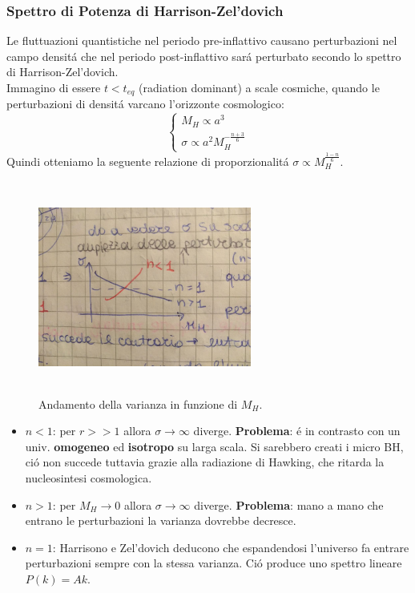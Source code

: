 \documentclass[12pt, a4paper]{article}
\begin{document}
\subsubsection{Spettro di Potenza di Harrison-Zel'dovich}
Le fluttuazioni quantistiche nel periodo pre-inflattivo causano perturbazioni nel campo densit\'{a} che nel periodo post-inflattivo sar\'{a} perturbato secondo lo spettro di Harrison-Zel'dovich.\\
Immagino di essere $t<t_{eq}$ (radiation dominant) a scale cosmiche, quando le perturbazioni di densit\'{a} varcano l'orizzonte cosmologico:
\begin{equation}
\begin{cases}
M_H\propto a^3
\\
\sigma\propto a^2 M_H^{-\frac{n+3}{6}} 
\end{cases}
\end{equation}
Quindi otteniamo la seguente relazione di proporzionalit\'{a} $\sigma\propto M_H^{\frac{1-n}{6}} $. 
\begin{figure}[htp]
\centering
\includegraphics[width=7cm, height=7cm]{images/harrisonzeldovich.jpeg}
\caption{Andamento della varianza in funzione di $M_H$.}
\label{fig:harrisonzeldovich}
\end{figure}
\begin{itemize}
\item $n<1$: per $r>>1$ allora $\sigma \rightarrow \infty$ diverge. \textbf{Problema}: \'{e} in contrasto con un univ. \textbf{omogeneo} ed \textbf{isotropo} su larga scala. Si sarebbero creati i micro BH, ci\'{o} non succede tuttavia grazie alla radiazione di Hawking, che ritarda la nucleosintesi cosmologica.
\item $n>1$: per $M_H\rightarrow 0 $ allora $\sigma \rightarrow \infty$ diverge. \textbf{Problema}: mano a mano che entrano le perturbazioni la varianza dovrebbe decresce.
\item $n=1$: Harrisono e Zel'dovich deducono che espandendosi l'universo fa entrare perturbazioni sempre con la stessa varianza. Ci\'{o} produce uno spettro  lineare $P(k)=Ak$. 
\end{itemize}
\end{document}
